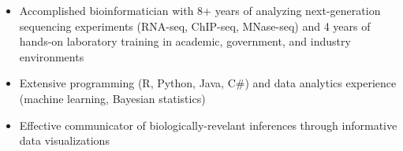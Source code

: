 

\begin{resentries}

\vspace{-2mm}

\begin{itemize}[leftmargin=*]
	\setlength{\itemsep}{-1.5mm}
	\item{Accomplished bioinformatician with 8+ years of analyzing next-generation sequencing experiments (RNA-seq, ChIP-seq, MNase-seq) and 4 years of hands-on laboratory training in academic, government, and industry environments}
	\item{Extensive programming (R, Python, Java, C\#) and data analytics experience (machine learning, Bayesian statistics)}
	\item{Effective communicator of biologically-revelant inferences through informative data visualizations}

\end{itemize}

\end{resentries}
